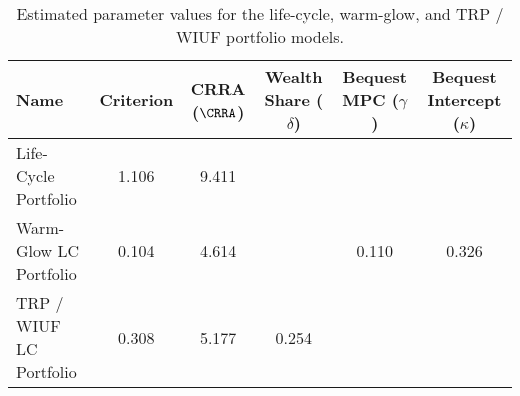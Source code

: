 \begin{table}\centering
    \begin{tabular}{lccccc}
        \toprule
        Name                   & Criterion & CRRA ($\CRRA $) & Wealth Share ($\delta $) & Bequest MPC ($ \gamma $) & Bequest Intercept ($ \kappa $) \\
        \midrule
        Life-Cycle Portfolio   & 1.106     & 9.411          &                         &                           &                                 \\
        Warm-Glow LC Portfolio & 0.104     & 4.614          &                         & 0.110                     & 0.326                          \\
        TRP / WIUF LC Portfolio       & 0.308     & 5.177          & 0.254                   &                           &                                 \\
        \bottomrule
    \end{tabular}
    \caption{Estimated parameter values for the life-cycle, warm-glow, and TRP / WIUF portfolio models.}
    \label{parameters}
\end{table}